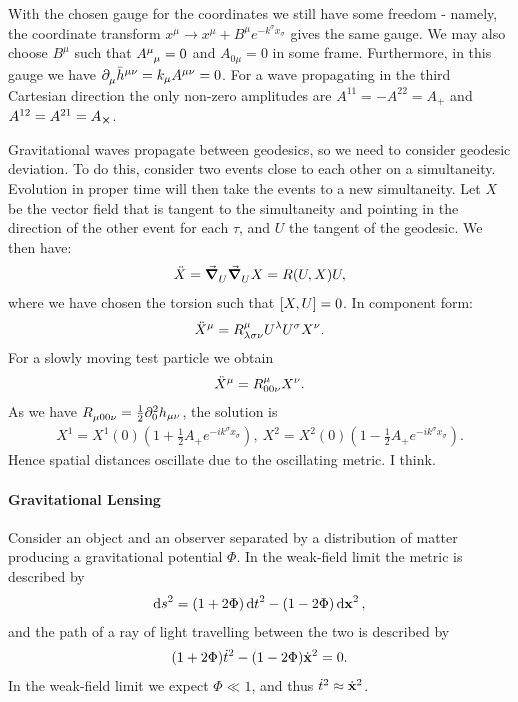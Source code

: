 With the chosen gauge for the coordinates we still have some freedom - namely, the coordinate transform $x^{\mu} \to x^{\mu} + B^{\mu}e^{-k^{\sigma}x_{\sigma}}$ gives the same gauge. We may also choose $B^{\mu}$ such that $\tensor{A}{^{\mu}_{\mu}} = 0$ and $A_{0\mu} = 0$ in some frame. Furthermore, in this gauge we have $\partial^{}_{\mu}\bar{h}^{\mu\nu} = k_{\mu}A^{\mu\nu} = 0$. For a wave propagating in the third Cartesian direction the only non-zero amplitudes are $A^{11} = -A^{22} = A_{+}$ and $A^{12} = A^{21} = A_{\cross}$.

Gravitational waves propagate between geodesics, so we need to consider geodesic deviation. To do this, consider two events close to each other on a simultaneity. Evolution in proper time will then take the events to a new simultaneity. Let $X$ be the vector field that is tangent to the simultaneity and pointing in the direction of the other event for each $\tau$, and $U$ the tangent of the geodesic. We then have:
\begin{align*}
	\ddot{X} = \grad_{U}^{}{\grad_{U}^{}{X}} = R(U, X)U,
\end{align*}
where we have chosen the torsion such that $\comm{X}{U} = 0$. In component form:
\begin{align*}
	\ddot{X}^{\mu} = \tensor*{R}{^{\mu}_{\lambda\sigma\nu}}U^{\lambda}U^{\sigma}X^{\nu}.
\end{align*}
For a slowly moving test particle we obtain
\begin{align*}
	\ddot{X}^{\mu} = \tensor*{R}{^{\mu}_{00\nu}}X^{\nu}.
\end{align*}
As we have $\tensor*{R}{_{\mu 00\nu}} = \frac{1}{2}\del[2]{0}{h_{\mu\nu}}$, the solution is
\begin{align*}
	X^{1} = X^{1}(0)\left(1 + \frac{1}{2}A_{+}e^{-ik^{\sigma}x_{\sigma}}\right),\ X^{2} = X^{2}(0)\left(1 - \frac{1}{2}A_{+}e^{-ik^{\sigma}x_{\sigma}}\right).
\end{align*}
Hence spatial distances oscillate due to the oscillating metric. I think.

\paragraph{Gravitational Lensing}
Consider an object and an observer separated by a distribution of matter producing a gravitational potential $\Phi$. In the weak-field limit the metric is described by
\begin{align*}
	\dd{s}^{2} = (1 + 2\Phi)\dd{t}^{2} - (1 - 2\Phi)\dd{\vb{x}}^{2},
\end{align*}
and the path of a ray of light travelling between the two is described by
\begin{align*}
	(1 + 2\Phi)\dot{t}^{2} - (1 - 2\Phi)\dot{\vb{x}}^{2} = 0.
\end{align*}
In the weak-field limit we expect $\Phi \ll 1$, and thus $\dot{t}^{2} \approx \dot{\vb{x}}^{2}$.

